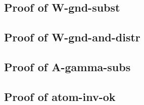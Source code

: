\subsection{Proof of W-gnd-subst}
\subsection{Proof of W-gnd-and-distr}
\subsection{Proof of A-gamma-subs}




\subsection{Proof of atom-inv-ok}


